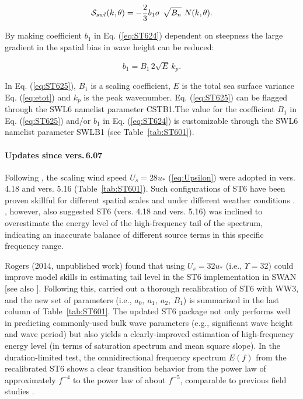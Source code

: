 \begin{equation}\label{eq:ST624}
  \cS_{swl}(k,\theta) = -\frac{2}{3}b_1 \sigma\ \sqrt{B_n}\ N(k,\theta).
\end{equation}

\noindent
By making coefficient $b_1$ in Eq. (\ref{eq:ST624}) dependent
on steepness the large gradient in the spatial bias in wave height
can be reduced:

\begin{equation}\label{eq:ST625}
   b_1 = B_1 \, 2\sqrt{E}\,k_p .
\end{equation}

In Eq. (\ref{eq:ST625}), $B_1$ is a scaling coefficient,
$E$  is the total sea surface variance Eq. (\ref{eq:etot}) and $k_p$
is the peak wavenumber.  Eq. (\ref{eq:ST625}) can be
flagged through the {\F SWL6} namelist parameter {\code CSTB1}.The value for the
coefficient $B_1$ in Eq. (\ref{eq:ST625}) and/or $b_1$ in Eq. (\ref{eq:ST624})
is customizable through the {\F SWL6} namelist parameter {\code SWLB1}
(see Table~\ref{tab:ST601}).

\noindent
\paragraph{Updates since vers.\,6.07} Following \citet{art:RBW12}, the
scaling wind speed $U_s = 28u_{\ast}$ (\ref{eq:Upsilon}) were adopted in
vers. 4.18 and vers. 5.16 (Table~\ref{tab:ST601}). Such configurations of {\code ST6} have been proven
skillful for different spatial scales and under different weather
conditions \citep[e.g.][]{art:ZBRY15, liu2017}. \citet[][their Fig. 5]{art:ZBRY15},
however, also suggested {\code ST6} (vers. 4.18 and vers. 5.16) was inclined to
overestimate the energy level of the high-frequency tail of the spectrum,
indicating an inaccurate balance of different source terms in this
specific frequency range.

Rogers (2014, unpublished work) found that using $U_s = 32u_{\ast}$ (i.e.,
$\Upsilon = 32$) could improve model skills in estimating tail level in
the {\code ST6} implementation in SWAN [see also \citet{Rogers2017}]. Following
this, \citet{Liu2019} carried out a thorough recalibration of {\code ST6} with WW3,
and the new set of parameters (i.e., $a_0,\ a_1,\ a_2,\ B_1$) is summarized
in the last column of Table~\ref{tab:ST601}. The updated {\code ST6} package not
only performs well in predicting commonly-used bulk wave parameters (e.g.,
significant wave height and wave period) but also yields a clearly-improved
estimation of high-frequency energy level (in terms of saturation spectrum
and mean square slope). In the duration-limited test, the omnidirectional
frequency spectrum $E(f)$ from the recalibrated {\code ST6} shows a clear transition
behavior from the power law of approximately $f^{-4}$ to the power law of
about $f^{-5}$, comparable to previous field studies \citep{Forristall1981}.

